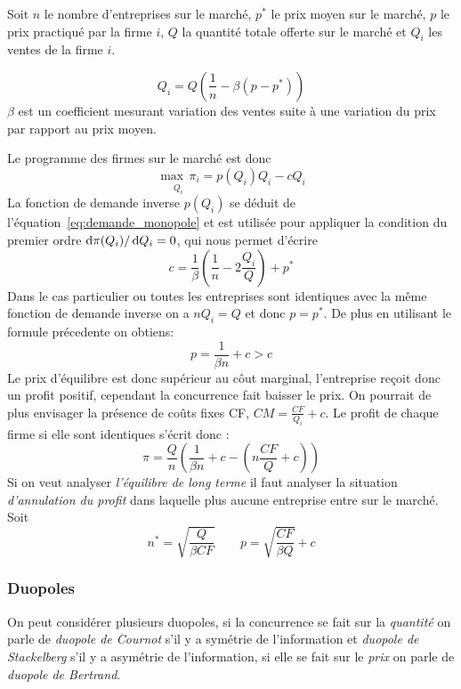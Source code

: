 \begin{tcolorbox}[title=Concurrence monopolistique]
  Soit $n$ le nombre d'entreprises sur le marché, $p^*$ le prix moyen sur le marché,
  $p$ le prix practiqué par la firme $i$, $Q$ la quantité totale offerte sur le marché 
  et $Q_i$ les ventes de la firme $i$.
  
  \begin{equation}
  	Q_i= Q\left(\frac{1}{n}-\beta (p-p^*)\right)
    \label{eq:demande_monopole}
  \end{equation}
  $\beta$ est un coefficient mesurant variation des ventes 
  suite à une variation du prix par rapport au prix moyen.
  
  Le programme des firmes sur le marché est donc
  \[
  	\underset{Q_i}{\max \, \pi_i}= p(Q_i)Q_i - c Q_i
  \]
  La fonction de demande inverse $p(Q_i)$ se déduit de l'équation~\ref{eq:demande_monopole}
  et est utilisée pour appliquer la condition du premier ordre $\operatorname{d}\! \pi(Q_i)/ \operatorname{d}\! Q_i = 0$,
  qui nous permet d'écrire
  \[
  	c= \frac{1}{\beta}\left(\frac{1}{n}-2\frac{Q_i}{Q}\right)+p^*
  \]
  Dans le cas particulier ou toutes les entreprises sont identiques 
  avec la même fonction de demande inverse on a $nQ_i=Q$ et donc $p=p^*$. 
  De plus en utilisant le formule précedente on obtiens:
  \[
  	p=\frac{1}{\beta n}+c >c 
  \]
  Le prix d'équilibre est donc supérieur au côut marginal, 
  l'entreprise reçoit donc un profit positif, cependant la concurrence fait baisser le prix. 
  On pourrait de plus envisager la présence de coûts fixes CF, $CM=\frac{CF}{Q_i}+c$. 
  Le profit de chaque firme si elle sont identiques s'écrit donc :
  \[
  	\pi = \frac{Q}{n} \left( \frac{1}{\beta n}+c- \left( n\frac{CF}{Q}+c \right) \right)
  \]
  Si on veut analyser \emph{l'équilibre de long terme} 
  il faut analyser la situation \emph{d'annulation du profit} 
  dans laquelle plus aucune entreprise entre sur le marché.
  Soit
  \[
  	n^* = \sqrt{\frac{Q}{\beta CF}} \qquad p=\sqrt{\frac{CF}{\beta Q}}+c
  \]
\end{tcolorbox}

\subsubsection{Duopoles} %
\label{sub:duopoles}

On peut considérer plusieurs duopoles, si la concurrence se fait sur la \emph{quantité} 
on parle de \emph{duopole de Cournot} s'il y a symétrie de l'information
et \emph{duopole de Stackelberg} s'il y a asymétrie de l'information, 
si elle se fait sur le \emph{prix} on parle de \emph{duopole de Bertrand}.

